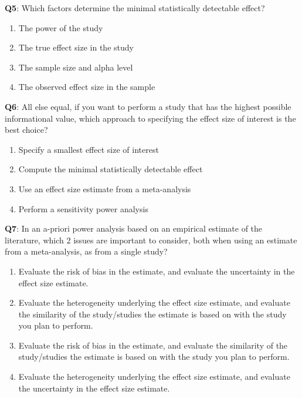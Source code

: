 \documentclass[
  oneside]{book}
\providecommand{\tightlist}{%
  \setlength{\itemsep}{0pt}\setlength{\parskip}{0pt}}
\begin{document}
\textbf{Q5}: Which factors determine the minimal statistically detectable effect?

\begin{enumerate}
\def\labelenumi{\Alph{enumi})}
\tightlist
\item
  The power of the study
\item
  The true effect size in the study
\item
  The sample size and alpha level
\item
  The observed effect size in the sample
\end{enumerate}

\textbf{Q6}: All else equal, if you want to perform a study that has the highest possible informational value, which approach to specifying the effect size of interest is the best choice?

\begin{enumerate}
\def\labelenumi{\Alph{enumi})}
\tightlist
\item
  Specify a smallest effect size of interest
\item
  Compute the minimal statistically detectable effect
\item
  Use an effect size estimate from a meta-analysis
\item
  Perform a sensitivity power analysis
\end{enumerate}

\textbf{Q7}: In an a-priori power analysis based on an empirical estimate of the literature, which 2 issues are important to consider, both when using an estimate from a meta-analysis, as from a single study?

\begin{enumerate}
\def\labelenumi{\Alph{enumi})}
\tightlist
\item
  Evaluate the risk of bias in the estimate, and evaluate the uncertainty in the effect size estimate.
\item
  Evaluate the heterogeneity underlying the effect size estimate, and evaluate the similarity of the study/studies the estimate is based on with the study you plan to perform.
\item
  Evaluate the risk of bias in the estimate, and evaluate the similarity of the study/studies the estimate is based on with the study you plan to perform.
\item
  Evaluate the heterogeneity underlying the effect size estimate, and evaluate the uncertainty in the effect size estimate.
\end{enumerate}
\end{document}
